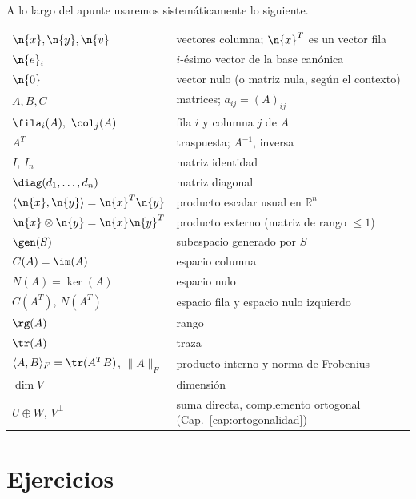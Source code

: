 A lo largo del apunte usaremos sistemáticamente lo siguiente.

\begingroup
\medskip
\centering
\small
\setlength{\tabcolsep}{5pt}
\renewcommand{\arraystretch}{1.0}
\begin{tabular}{@{}ll@{}}
\hline
$\n{x},\n{y},\n{v}$ & vectores columna; $\n{x}^T$ es un vector fila \\
$\n{e}_i$ & $i$-ésimo vector de la base canónica \\
$\n{0}$ & vector nulo (o matriz nula, según el contexto) \\
$A,B,C$ & matrices; $a_{ij}=(A)_{ij}$ \\
$\fila_i(A),\ \col_j(A)$ & fila $i$ y columna $j$ de $A$ \\
$A^T$ & traspuesta; $A^{-1}$, inversa \\
$I$, $I_n$ & matriz identidad \\
$\diag(d_1,\dots,d_n)$ & matriz diagonal \\
$\langle \n{x},\n{y}\rangle = \n{x}^T\n{y}$ & producto escalar usual en $\mathbb{R}^n$ \\
$\n{x}\otimes\n{y} = \n{x}\n{y}^T$ & producto externo (matriz de rango $\le 1$) \\
$\gen(S)$ & subespacio generado por $S$ \\
$C(A)=\im(A)$ & espacio columna \\
$N(A)=\ker(A)$ & espacio nulo \\
$C(A^T)$, $N(A^T)$ & espacio fila y espacio nulo izquierdo \\
$\rg(A)$ & rango \\
$\tr(A)$ & traza \\
$\langle A,B\rangle_F=\tr(A^TB)$, $\|A\|_F$ & producto interno y norma de Frobenius \\
$\dim V$ & dimensión \\
$U\oplus W$, $V^{\perp}$ & suma directa, complemento ortogonal (Cap.~\ref{cap:ortogonalidad}) \\
\hline
\end{tabular}
\par
\endgroup

\section*{Ejercicios}


